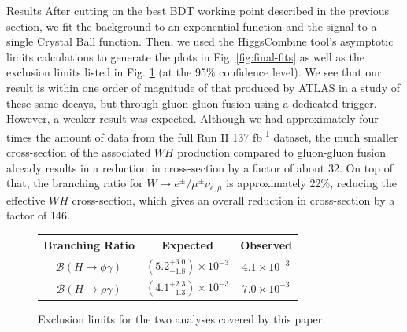 \begin{section}{Results}
After cutting on the best BDT working point described in the previous section, we fit the background to an exponential function and the signal to a single Crystal Ball function. Then, we used the HiggsCombine tool's asymptotic limits calculations\cite{cite-hcomb} to generate the plots in Fig. \ref{fig:final-fits} as well as the exclusion limits listed in Fig. \ref{fig:exclude-lims} (at the 95\% confidence level). We see that our result is within one order of magnitude of that produced by ATLAS in a study\cite{cite-rpg-brs} of these same decays, but through gluon-gluon fusion using a dedicated trigger. However, a weaker result was expected. Although we had approximately four times the amount of data from the full Run II 137 fb\textsuperscript{-1} dataset, the much smaller cross-section of the associated $WH$ production compared to gluon-gluon fusion already results in a reduction in cross-section by a factor of about 32. On top of that, the branching ratio for $W\rightarrow e^{\pm}/\mu^{\pm}\nu_{e,\mu}$ is approximately 22\%, reducing the effective $WH$ cross-section, which gives an overall reduction in cross-section by a factor of 146.

\begin{figure}[htb]
\centering
\begin{tabular}{ccc}
\toprule
Branching Ratio & Expected & Observed \\
\midrule
$\mathcal{B}(H\rightarrow\phi\gamma)$ & $(5.2^{+3.0}_{-1.8})\times10^{-3}$ & $4.1\times10^{-3}$ \\
$\mathcal{B}(H\rightarrow\rho\gamma)$ & $(4.1^{+2.3}_{-1.3})\times10^{-3}$ & $7.0\times10^{-3}$ \\
\bottomrule
\end{tabular}
\caption{Exclusion limits for the two analyses covered by this paper.}
\label{fig:exclude-lims}
\end{figure}


\end{section}
